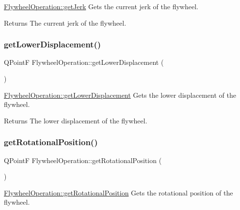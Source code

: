 \hyperlink{class_flywheel_operation_ad443ef22229c1584da213f50234720bf}{Flywheel\+Operation\+::get\+Jerk} Gets the current jerk of the flywheel. 

\begin{DoxyReturn}{Returns}
The current jerk of the flywheel. 
\end{DoxyReturn}
\hypertarget{class_flywheel_operation_a2b9d24d0fbbf1d9cb79bb0aa54f6f6ae}{}\label{class_flywheel_operation_a2b9d24d0fbbf1d9cb79bb0aa54f6f6ae} 
\subsubsection{\texorpdfstring{get\+Lower\+Displacement()}{getLowerDisplacement()}}
{\footnotesize\ttfamily Q\+PointF Flywheel\+Operation\+::get\+Lower\+Displacement (\begin{DoxyParamCaption}{ }\end{DoxyParamCaption})}



\hyperlink{class_flywheel_operation_a2b9d24d0fbbf1d9cb79bb0aa54f6f6ae}{Flywheel\+Operation\+::get\+Lower\+Displacement} Gets the lower displacement of the flywheel. 

\begin{DoxyReturn}{Returns}
The lower displacement of the flywheel. 
\end{DoxyReturn}
\hypertarget{class_flywheel_operation_a0e1ba213763760cf0128dfdc8436cfdf}{}\label{class_flywheel_operation_a0e1ba213763760cf0128dfdc8436cfdf} 
\subsubsection{\texorpdfstring{get\+Rotational\+Position()}{getRotationalPosition()}}
{\footnotesize\ttfamily Q\+PointF Flywheel\+Operation\+::get\+Rotational\+Position (\begin{DoxyParamCaption}{ }\end{DoxyParamCaption})}



\hyperlink{class_flywheel_operation_a0e1ba213763760cf0128dfdc8436cfdf}{Flywheel\+Operation\+::get\+Rotational\+Position} Gets the rotational position of the flywheel. 

